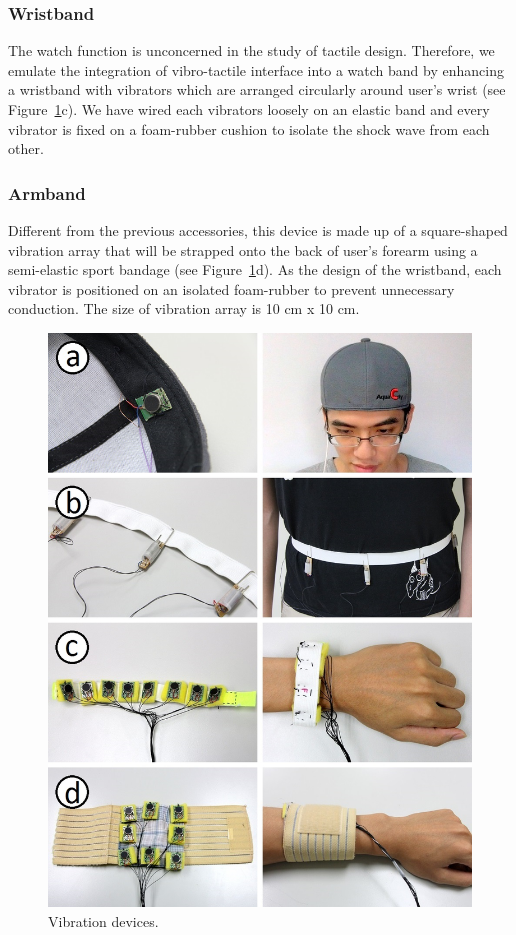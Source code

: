 \documentclass{sigchi}
\begin{document}
\subsubsection{Wristband}
The watch function is unconcerned in the study of tactile design. Therefore, we emulate the integration of vibro-tactile interface into a watch band by enhancing a wristband with vibrators which are arranged circularly around user's wrist (see Figure~\ref{fig:vibration_devices}c). We have wired each vibrators loosely on an elastic band and every vibrator is fixed on a foam-rubber cushion to isolate the shock wave from each other.

\subsubsection{Armband}
Different from the previous accessories, this device is made up of a square-shaped vibration array that will be strapped onto the back of user's forearm using a semi-elastic sport bandage (see Figure~\ref{fig:vibration_devices}d). As the design of the wristband, each vibrator is positioned on an isolated foam-rubber to prevent unnecessary conduction. The size of vibration array is 10 cm x 10 cm.

\begin{figure}[!t]
\centering
\includegraphics[width=\columnwidth]{prototype_vibro2}
\caption{Vibration devices.}
\label{fig:vibration_devices}
\end{figure}
\end{document}

